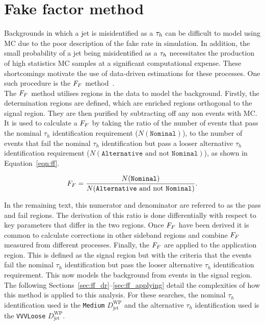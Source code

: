 \section{Fake factor method}
\label{sec:ff}

Backgrounds in which a jet is misidentified as a $\tau_{h}$ can be difficult to model using \ac{MC} due to the poor description of the \jtth fake rate in simulation. 
In addition, the small probability of a jet being misidentified as a $\tau_{h}$ necessitates the production of high statistics \ac{MC} samples at a significant computational expense.
These shortcomings motivate the use of data-driven estimations for these processes. 
One such procedure is the $F_{F}$ method~\cite{Sirunyan:2018zut,CMS:2018lkr}. \\

The $F_{F}$ method utilises regions in the data to model the \jtth background. 
Firstly, the determination regions are defined, which are \jtth enriched regions orthogonal to the signal region. 
They are then purified by subtracting off any non \jtth events with \ac{MC}.
It is used to calculate a $F_{F}$ by taking the ratio of the number of \jtth events that pass the nominal $\tau_h$ identification requirement ($N(\texttt{Nominal})$), to the number of \jtth events that fail the nominal $\tau_h$ identification but pass a looser alternative $\tau_h$ identification requirement ($N(\texttt{Alternative}\text{ and not }\texttt{Nominal})$), as shown in Equation~\ref{eqn:ff}.

\begin{equation}
F_{F} = \frac{N(\texttt{Nominal})}{N(\texttt{Alternative}\text{ and not }\texttt{Nominal})}.
\label{eqn:ff}
\end{equation}

In the remaining text, this numerator and denominator are referred to as the pass and fail regions.
The derivation of this ratio is done differentially with respect to key parameters that differ in the two regions.
Once $F_{F}$ have been derived it is common to calculate corrections in other sideband regions and combine $F_{F}$ measured from different processes.
Finally, the $F_{F}$ are applied to the application region. 
This is defined as the signal region but with the criteria that the \jtth events fail the nominal $\tau_h$ identification but pass the looser alternative $\tau_h$ identification requirement.
This now models the background from \jtth events in the signal region. \\

The following Sections~\ref{sec:ff_dr}--\ref{sec:ff_applying} detail the complexities of how this method is applied to this analysis.
For these searches, the nominal $\tau_h$ identification used is the \texttt{Medium} $D_{\text{jet}}^{\text{WP}}$ and the alternative $\tau_h$ identification used is the \texttt{VVVLoose} $D_{\text{jet}}^{\text{WP}}$.

